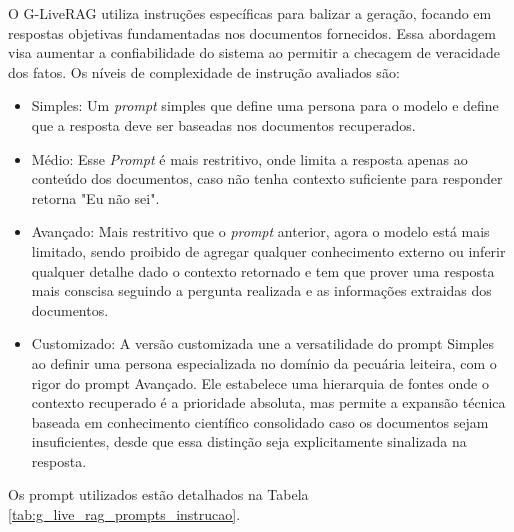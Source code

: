 O G-LiveRAG utiliza instruções específicas para balizar a geração, focando em respostas objetivas fundamentadas nos documentos fornecidos. Essa abordagem visa aumentar a confiabilidade do sistema ao permitir a checagem de veracidade dos fatos. Os níveis de complexidade de instrução avaliados são:

\begin{itemize}
    \item{Simples}: Um \textit{prompt} simples que define uma persona para o modelo e define que a resposta deve  ser baseadas nos documentos recuperados.
    
    \item{Médio}: Esse \textit{Prompt} é mais restritivo, onde limita a resposta apenas ao conteúdo dos documentos, caso não tenha contexto suficiente para responder retorna "Eu não sei".
    
    \item{Avançado}: Mais restritivo que o \textit{prompt} anterior, agora o modelo está mais limitado, sendo proibido de agregar qualquer conhecimento externo ou inferir qualquer detalhe dado o contexto retornado e tem que prover uma resposta mais conscisa seguindo a pergunta realizada e as informações extraidas dos documentos.
    
    \item{Customizado}: A versão customizada une a versatilidade do prompt Simples ao definir uma persona especializada no domínio da pecuária leiteira, com o rigor do prompt Avançado. Ele estabelece uma hierarquia de fontes onde o contexto recuperado é a prioridade absoluta, mas permite a expansão técnica baseada em conhecimento científico consolidado caso os documentos sejam insuficientes, desde que essa distinção seja explicitamente sinalizada na resposta.
\end{itemize} 


 Os prompt utilizados estão detalhados na Tabela \ref{tab:g_live_rag_prompts_instrucao}.

